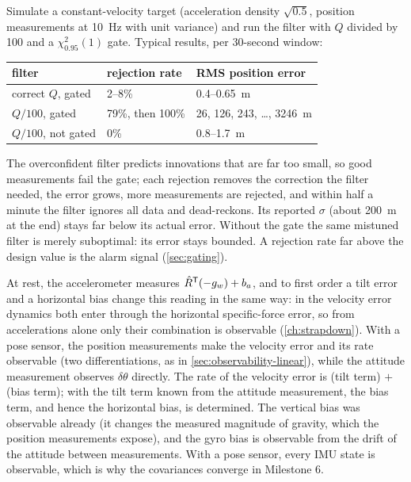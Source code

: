 \begin{solutions}
  \item Simulate a constant-velocity target (acceleration density $\sqrt{0.5}$, position measurements at 10~Hz with unit variance) and run the
        filter with $Q$ divided by 100 and a $\chi^2_{0.95}(1)$ gate. Typical results, per 30-second window:
        \begin{center}\small
        \begin{tabular}{@{}l l l@{}}
        \toprule
        filter & rejection rate & RMS position error \\
        \midrule
        correct $Q$, gated & 2--8\% & 0.4--0.65~m \\
        $Q/100$, gated & 79\%, then 100\% & 26, 126, 243, \dots, 3246~m \\
        $Q/100$, not gated & 0\% & 0.8--1.7~m \\
        \bottomrule
        \end{tabular}
        \end{center}
        The overconfident filter predicts innovations that are far too small, so good measurements fail the gate; each rejection removes the
        correction the filter needed, the error grows, more measurements are rejected, and within half a minute the filter ignores all data and
        dead-reckons. Its reported $\sigma$ (about 200~m at the end) stays far below its actual error. Without the gate the same mistuned filter is
        merely suboptimal: its error stays bounded. A rejection rate far above the design value is the alarm signal (\cref{sec:gating}).

  \item At rest, the accelerometer measures $\hat R^{\mathsf{T}}(-g_w) + b_a$, and to first order a tilt error and a horizontal bias change this reading in the same way:
        in the velocity error dynamics both enter through the horizontal specific-force error, so from accelerations alone only their combination is
        observable (\cref{ch:strapdown}). With a pose sensor, the position measurements make the velocity error and its rate observable (two
        differentiations, as in \cref{sec:observability-linear}), while the attitude measurement observes $\delta\theta$ directly. The rate of the velocity
        error is (tilt term) $+$ (bias term); with the tilt term known from the attitude measurement, the bias term, and hence the horizontal bias, is
        determined. The vertical bias was observable already (it changes the measured magnitude of gravity, which the position measurements expose),
        and the gyro bias is observable from the drift of the attitude between measurements. With a pose sensor, every IMU state is observable,
        which is why the covariances converge in Milestone 6.


\end{solutions}
